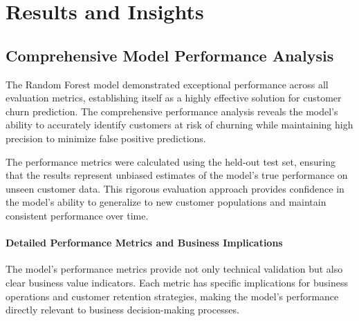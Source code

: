 \documentclass{article}
\begin{document}
\section{Results and Insights}

\subsection{Comprehensive Model Performance Analysis}

The Random Forest model demonstrated exceptional performance across all evaluation metrics, establishing itself as a highly effective solution for customer churn prediction. The comprehensive performance analysis reveals the model's ability to accurately identify customers at risk of churning while maintaining high precision to minimize false positive predictions.

The performance metrics were calculated using the held-out test set, ensuring that the results represent unbiased estimates of the model's true performance on unseen customer data. This rigorous evaluation approach provides confidence in the model's ability to generalize to new customer populations and maintain consistent performance over time.

\paragraph{Detailed Performance Metrics and Business Implications}

The model's performance metrics provide not only technical validation but also clear business value indicators. Each metric has specific implications for business operations and customer retention strategies, making the model's performance directly relevant to business decision-making processes.
\end{document}
